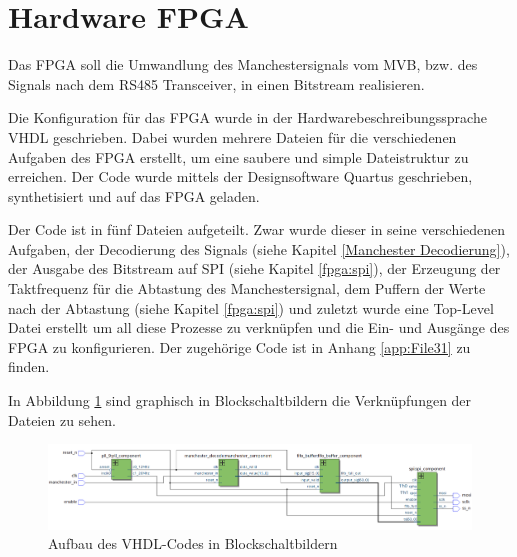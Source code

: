 


\section{Hardware FPGA}
\label{sec:HardwareFPGA}
Das FPGA soll die Umwandlung des Manchestersignals vom MVB, bzw. des Signals
nach dem RS485 Transceiver, in einen Bitstream realisieren. 

Die Konfiguration für das FPGA wurde in der Hardwarebeschreibungssprache VHDL geschrieben. Dabei wurden
mehrere Dateien für die verschiedenen Aufgaben des FPGA erstellt, um eine saubere und simple 
Dateistruktur zu erreichen. Der Code wurde mittels der Designsoftware Quartus geschrieben,
synthetisiert und auf das FPGA geladen.

Der Code ist in fünf Dateien aufgeteilt. Zwar wurde dieser in seine verschiedenen Aufgaben, der
Decodierung des Signals (siehe Kapitel \ref{Manchester Decodierung}), der Ausgabe des Bitstream auf SPI
(siehe Kapitel \ref{fpga:spi}), der Erzeugung der Taktfrequenz für die Abtastung des Manchestersignal,
dem Puffern der Werte nach der Abtastung (siehe Kapitel \ref{fpga:spi}) und zuletzt wurde eine Top-Level Datei erstellt um all diese
Prozesse zu verknüpfen und die Ein- und Ausgänge des FPGA zu konfigurieren. Der zugehörige Code ist in Anhang \ref{app:File31} zu finden.

In Abbildung \ref{fig:AufbauFPGA} sind graphisch in Blockschaltbildern die Verknüpfungen der Dateien zu sehen.

\begin{figure}[H]
    \centering
    \includegraphics[width=1\linewidth]{Figures/Chap3/FPGA/FPGA_Darstellung_Projekt.png}
    \caption{Aufbau des VHDL-Codes in Blockschaltbildern}
    \label{fig:AufbauFPGA}
\end{figure}

